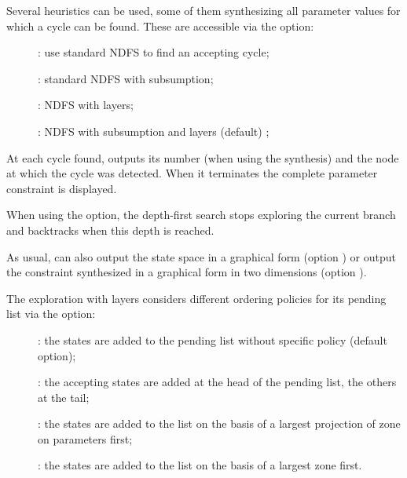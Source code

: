 Several heuristics can be used, some of them synthesizing all parameter values for which a cycle can be found.
These are accessible via the  option:

\begin{description}
	\item[]: use standard NDFS to find an accepting cycle;
	\item[]: standard NDFS with subsumption;
	\item[]: NDFS with layers;
	\item[]: NDFS with subsumption and layers (default)	;
\end{description}

At each cycle found, \imitator{} outputs its number (when using the synthesis) and
the node at which the cycle was detected. When it terminates the complete parameter
constraint is displayed.


When using the  option, the depth-first search stops exploring
the current branch and backtracks when this depth is reached.


As usual, \imitator{} can also
output the state space in a graphical form (option )
or
output the constraint synthesized in a graphical form in two dimensions (option ).

The exploration with layers considers different ordering policies for its pending
list via the  option:
\begin{description}
	\item[]: the states are added to the pending list
	      without specific policy	(default option);
	\item[]: the accepting states are added at
	      the head of the pending list, the others at the tail;
	\item[]: the states are added to the list on
	      the basis of a largest projection of zone on parameters first;
	\item[]: the states are added to the list on
	      the basis of a largest zone first.
\end{description}


